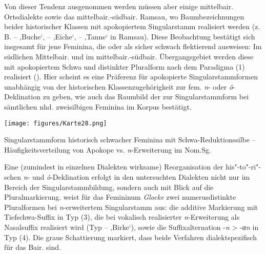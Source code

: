 \begin{sloppypar}
Von dieser Tendenz ausgenommen werden müssen aber einige mittelbair. Ortsdialekte sowie das mittelbair.-südbair. Ramsau, wo Baumbezeichnungen beider historischer Klassen mit apokopiertem Singularstamm realisiert werden (z.\,B.  --  ‚Buche‘,  --  ‚Eiche‘,  --  ‚Tanne‘ in Ramsau). Diese Beobachtung bestätigt sich insgesamt für jene Feminina, die \citet[§44]{Paul1968} oder \citet{Lexer1872-1878} als sicher schwach flektierend ausweisen: Im südlichen Mittelbair. und im mittelbair.-südbair. Übergangsgebiet werden diese mit apokopiertem Schwa und distinkter Pluralform nach dem Paradigma (1) realisiert (). Hier scheint es eine Präferenz für apokopierte Singularstammformen unabhängig von der historischen Klassenzugehörigkeit zur fem. \textit{n}{}- oder \textit{ô}{}-Deklination zu geben, wie auch das Raumbild der  zur Singularstammform bei sämtlichen nhd. zweisilbigen Feminina im Korpus bestätigt.
\end{sloppypar}

\begin{map}
\texttt{[image: figures/Karte28.png]}
\caption{Singularstammform historisch schwacher Feminina mit Schwa-Reduktionssilbe -- Häufigkeitsverteilung von Apokope vs. \textit{n}{}-Erweiterung im Nom.Sg.}
\label{map:28}
\end{map}

Eine (zumindest in einzelnen Dialekten wirksame) Reorganisation der his"-to"-ri"-schen \textit{n}{}- und \textit{ô}{}-Deklination erfolgt in den untersuchten Dialekten nicht nur im Bereich der Singularstammbildung, sondern auch mit Blick auf die Pluralmarkierung.  weist für das Femininum \textit{Glocke} zwei numerusdistinkte Pluralformen bei \textit{n}{}-erweitertem Singularstamm aus: die additive Markierung mit Tiefschwa-Suffix in Typ (3), die bei vokalisch realisierter \textit{n}{}-Erweiterung als Nasalsuffix realisiert wird (Typ  --  ‚Birke‘), sowie die Suffixalternation -\textit{n} > -\textit{αn} in Typ (4). Die graue Schattierung markiert, dass beide Verfahren dialektspezifisch für das Bair. sind.

